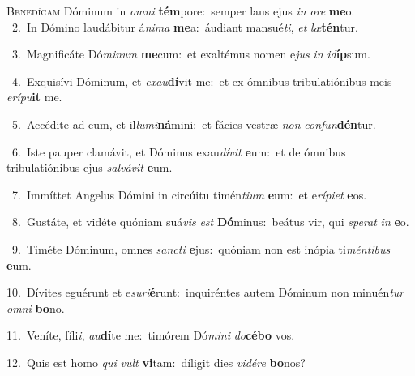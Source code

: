 \lettrine{\initial\textcolor{\initialcolor}{B}}{enedícam} Dóminum in \textit{om}\-\textit{ni} \textbf{tém}\-pore:~\star semper laus ejus \textit{in} \textit{o}\-\textit{re} \textbf{me}\-o.\\
{\numbfont\textcolor{\numbcolor}{~2.}}~In Dómino laudábitur á\-\textit{ni}\-\textit{ma} \textbf{me}\-a:~\star áudiant mansué\-\textit{ti}\-, \textit{et} \textit{læ}\-\textbf{tén}tur.\par
{\numbfont\textcolor{\numbcolor}{~3.}}~Magnificáte Dó\-\textit{mi}\-\textit{num} \textbf{me}\-cum:~\star et exaltémus nomen e\textit{jus} \textit{in} \textit{id}\-\textbf{íp}sum.\par
{\numbfont\textcolor{\numbcolor}{~4.}}~Exquisívi Dóminum, et \textit{ex}\-\textit{au}\textbf{dí}vit me:~\star et ex ómnibus tribulatiónibus meis \textit{e}\-\textit{rí}\textit{pu}\textbf{it} me.\par
{\numbfont\textcolor{\numbcolor}{~5.}}~Accédite ad eum, et il\-\textit{lu}\-\textit{mi}\textbf{ná}mini:~\star et fácies vestræ \textit{non} \textit{con}\-\textit{fun}\textbf{dén}tur.\par
{\numbfont\textcolor{\numbcolor}{~6.}}~Iste pauper clamávit, et Dóminus exau\-\textit{dí}\-\textit{vit} \textbf{e}\-um:~\star et de ómnibus tribulatiónibus ejus \textit{sal}\-\textit{vá}\textit{vit} \textbf{e}\-um.\par
{\numbfont\textcolor{\numbcolor}{~7.}}~Immíttet Angelus Dómini in circúitu timén\-\textit{ti}\-\textit{um} \textbf{e}\-um:~\star et e\-\textit{rí}\-\textit{pi}\textit{et} \textbf{e}\-os.\par
{\numbfont\textcolor{\numbcolor}{~8.}}~Gustáte, et vidéte quóniam suá\textit{vis} \textit{est} \textbf{Dó}\-minus:~\star beátus vir, qui \textit{spe}\-\textit{rat} \textit{in} \textbf{e}\-o.\par
{\numbfont\textcolor{\numbcolor}{~9.}}~Timéte Dóminum, omnes \textit{sanc}\-\textit{ti} \textbf{e}\-jus:~\star quóniam non est inópia ti\-\textit{mén}\-\textit{ti}\textit{bus} \textbf{e}\-um.\par
{\numbfont\textcolor{\numbcolor}{10.}}~Dívites eguérunt et e\-\textit{su}\-\textit{ri}\textbf{é}runt:~\star inquiréntes autem Dóminum non minuén\textit{tur} \textit{om}\-\textit{ni} \textbf{bo}\-no.\par
{\numbfont\textcolor{\numbcolor}{11.}}~Veníte, fíli\-\textit{i}\-, \textit{au}\-\textbf{dí}te me:~\star timórem Dó\-\textit{mi}\-\textit{ni} \textit{do}\-\textbf{cé}\textbf{bo} vos.\par
{\numbfont\textcolor{\numbcolor}{12.}}~Quis est homo \textit{qui} \textit{vult} \textbf{vi}\-tam:~\star díligit dies \textit{vi}\-\textit{dé}\textit{re} \textbf{bo}\-nos?\par
